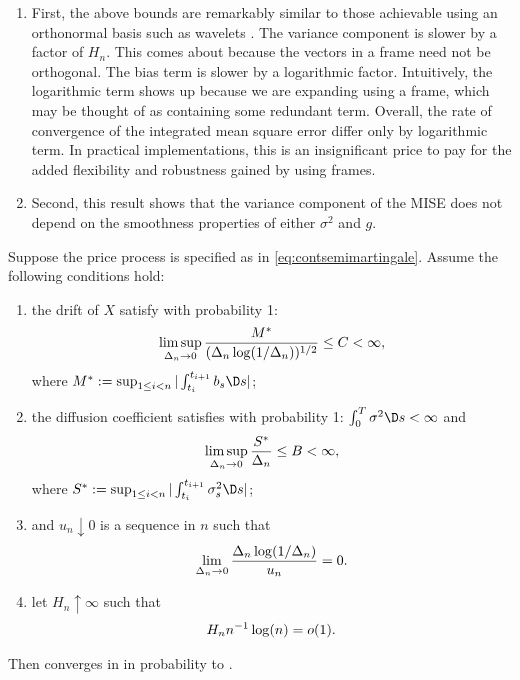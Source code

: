 \begin{remark}\mbox{}
  \begin{enumerate}  
    \item First, the above bounds are remarkably similar to those achievable using an orthonormal basis such as wavelets \citep{GenonCatalot1992}. The variance component is slower by a factor of $H_n$. This comes about because the vectors in a frame need not be orthogonal. The bias term is slower by a logarithmic factor. Intuitively, the logarithmic term shows up because we are expanding \sv using a frame, which may be thought of as containing some redundant term. Overall, the rate of convergence of the integrated mean square error differ only by logarithmic term. In practical implementations, this is an insignificant price to pay for the added flexibility and robustness gained by using frames. 
    \item Second, this result shows that the variance component of the MISE does not depend on the smoothness properties of either $\sigma^2$ and $g$.  
  \end{enumerate}
\end{remark}
\begin{prop}\label{pro:finite}
  Suppose the  price process is specified as in \eqref{eq:contsemimartingale}.  Assume the following conditions hold:
  \begin{enumerate}[label=\emph{(}\roman*\emph{)}]
    \item 
  the drift of $X$ satisfy with probability 1:
  \begin{align}
    \limsup_{\Delta_n \to 0} \frac{M^*}{(\Delta_n \log(1/\Delta_n))^{1/2}} \le  C< \infty, \notag
    \label{}
  \end{align}
where $M^* : = \sup_{1 \le i <n} \vert \int^{t_{i+1}}_{t_i} b_s \D s\vert$;
\item the diffusion coefficient satisfies with probability 1:  $\int^T_0 \sigma^2 \D s < \infty$ and 
  \begin{align}
\limsup_{\Delta_n \to 0} \frac{S^*}{\Delta_n} \le B <\infty, \notag
    \label{}
  \end{align}
  where $S^* := \sup_{1 \le i <n} \vert \int^{t_{i+1}}_{t_i} \sigma^2_s \D s\vert$;
\item and   $u_n \downarrow 0 $ is a sequence in $n$ such that  
\begin{align}
    \lim_{\Delta_n \to 0} \frac{\Delta_n \log (1/\Delta_n)}{u_n} = 0.\notag
    \label{}
  \end{align}
\item let $H_n \uparrow \infty$ such that 
  \begin{align}
    H_n n^{-1} \log(n) = o(1).\notag
    \label{}
  \end{align}
  \end{enumerate}
  Then
  \svnx converges in \Ltwo in probability to \sv.
\end{prop}

